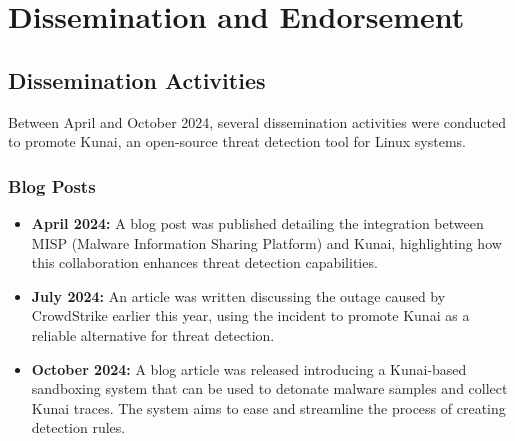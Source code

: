 \chapter{Dissemination and Endorsement}

\section*{Dissemination Activities}

Between April and October 2024, several dissemination activities were conducted to promote Kunai, an open-source threat detection tool for Linux systems.

\subsection*{Blog Posts}
\begin{itemize}
    \item \textbf{April 2024:} A blog post was published detailing the integration between MISP (Malware Information Sharing Platform) and Kunai, highlighting how this collaboration enhances threat detection capabilities.
    \item \textbf{July 2024:} An article was written discussing the outage caused by CrowdStrike earlier this year, using the incident to promote Kunai as a reliable alternative for threat detection.
    \item \textbf{October 2024:} A blog article was released introducing a Kunai-based sandboxing system that can be used to detonate malware samples and collect Kunai traces. The system aims to ease and streamline the process of creating detection rules.
\end{itemize}

